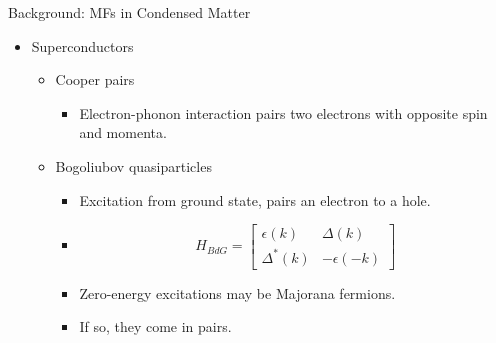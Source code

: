 \documentclass[xcolor=dvipsnames,10pt,aspectratio=169]{beamer}
\newcommand{\de}{\Delta}
\newcommand{\BD}{Background}
\begin{document}
  \begin{frame}{\BD: MFs in Condensed Matter}
    \begin{multicols}{2}
      \begin{itemize}
        \item Superconductors
          \begin{itemize}
            \item Cooper pairs
            \begin{itemize}
              \item Electron-phonon interaction pairs two electrons with opposite spin and momenta.
            \end{itemize}
            \item Bogoliubov quasiparticles
            \begin{itemize}
              \item Excitation from ground state, pairs an electron to a hole.
              \item[] \[ H_{BdG} = \begin{bmatrix} \epsilon(k) & \de(k) \\ \de^\ast(k) & -\epsilon(-k) \end{bmatrix} \]
              \item Zero-energy excitations may be Majorana fermions.
              \item If so, they come in pairs.
            \end{itemize}
          \end{itemize}
      \end{itemize}
      \vspace{30mm}


    \end{multicols}

  \end{frame}
\end{document}
